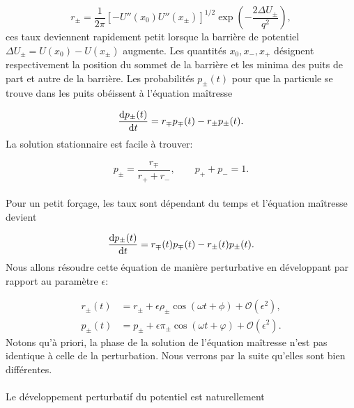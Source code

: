 \begin{equation}\label{Kramers}
	r_\pm = \frac{1}{2\pi} [-U''(x_0)U''(x_\pm)]^{1/2} \exp\left(-\frac{2\Delta U_\pm}{q^2}\right),
\end{equation}
ces taux deviennent rapidement petit lorsque la barrière de potentiel $\Delta U_\pm = U(x_0) - U(x_\pm)$  augmente. Les quantités $x_0, x_-, x_+$ désignent respectivement la position du sommet de la barrière et les minima des puits de part et autre de la barrière. Les probabilités $p_\pm(t)$ pour que la particule se trouve dans les puits obéissent à l'équation maîtresse

\begin{equation}\label{master_sans_forcage}
	\dv{p_\pm(t)}{t} = r_\mp p_\mp(t) - r_\pm p_\pm(t).
\end{equation}
La solution stationnaire est facile à trouver:

\begin{equation}\label{sol_proba_sans_forcage}
	p_\pm = \frac{r_\mp}{r_+ + r_-}, \qquad p_+ + p_- = 1.
\end{equation}

\paragraph{} Pour un petit forçage, les taux sont dépendant du temps et l'équation maîtresse devient

\begin{equation}\label{master_forcage}
	\dv{p_\pm(t)}{t} = r_\mp(t) p_\mp(t) - r_\pm(t) p_\pm(t).
\end{equation}
Nous allons résoudre cette équation de manière perturbative en développant par rapport au paramètre $\epsilon$:

\begin{equation}\label{developpements_perturbatifs}
\begin{split}
	r_\pm(t) &= r_\pm + \epsilon \rho_\pm \cos(\omega t + \phi) + \mathcal O(\epsilon^2), \\
	p_\pm(t) &= p_\pm + \epsilon \pi_\pm  \cos(\omega t + \varphi) + \mathcal O(\epsilon^2).
\end{split}
\end{equation}
Notons qu'à priori, la phase de la solution de l'équation maîtresse n'est pas identique à celle de la perturbation. Nous verrons par la suite qu'elles sont bien différentes. 

\paragraph{} Le développement perturbatif du potentiel est naturellement

